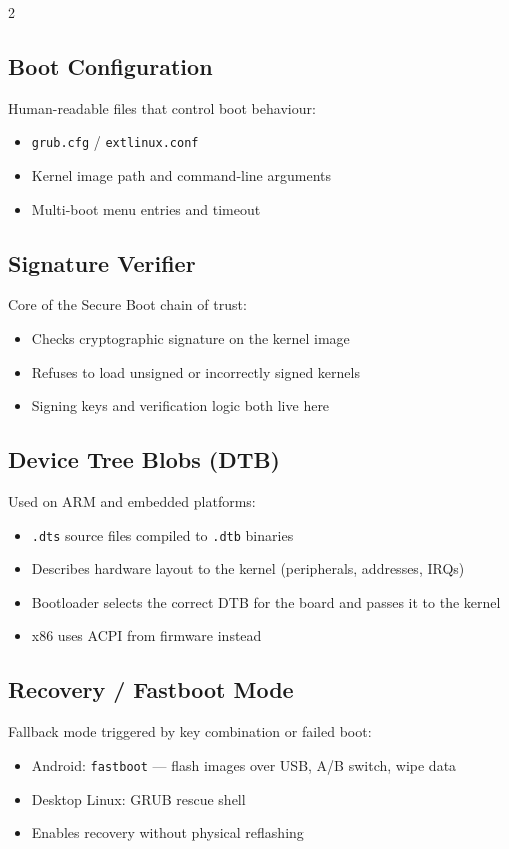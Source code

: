 2\documentclass[11pt,a4paper]{article}
\begin{document}
\subsection{Boot Configuration}
Human-readable files that control boot behaviour:
\begin{itemize}[noitemsep]
  \item \texttt{grub.cfg} / \texttt{extlinux.conf}
  \item Kernel image path and command-line arguments
  \item Multi-boot menu entries and timeout
\end{itemize}

\subsection{Signature Verifier}
Core of the Secure Boot chain of trust:
\begin{itemize}[noitemsep]
  \item Checks cryptographic signature on the kernel image
  \item Refuses to load unsigned or incorrectly signed kernels
  \item Signing keys and verification logic both live here
\end{itemize}

\subsection{Device Tree Blobs (DTB)}
Used on ARM and embedded platforms:
\begin{itemize}[noitemsep]
  \item \texttt{.dts} source files compiled to \texttt{.dtb} binaries
  \item Describes hardware layout to the kernel (peripherals, addresses, IRQs)
  \item Bootloader selects the correct DTB for the board and passes it to the kernel
  \item x86 uses ACPI from firmware instead
\end{itemize}

\subsection{Recovery / Fastboot Mode}
Fallback mode triggered by key combination or failed boot:
\begin{itemize}[noitemsep]
  \item Android: \texttt{fastboot} --- flash images over USB, A/B switch, wipe data
  \item Desktop Linux: GRUB rescue shell
  \item Enables recovery without physical reflashing
\end{itemize}
\end{document}
